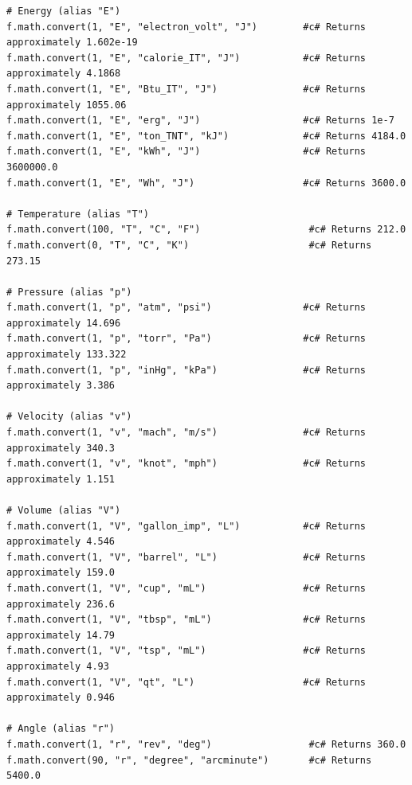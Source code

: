 \begin{verbatim}
# Energy (alias "E")
f.math.convert(1, "E", "electron_volt", "J")        #c# Returns approximately 1.602e-19
f.math.convert(1, "E", "calorie_IT", "J")           #c# Returns approximately 4.1868
f.math.convert(1, "E", "Btu_IT", "J")               #c# Returns approximately 1055.06
f.math.convert(1, "E", "erg", "J")                  #c# Returns 1e-7
f.math.convert(1, "E", "ton_TNT", "kJ")             #c# Returns 4184.0
f.math.convert(1, "E", "kWh", "J")                  #c# Returns 3600000.0
f.math.convert(1, "E", "Wh", "J")                   #c# Returns 3600.0

# Temperature (alias "T")
f.math.convert(100, "T", "C", "F")                   #c# Returns 212.0
f.math.convert(0, "T", "C", "K")                     #c# Returns 273.15

# Pressure (alias "p")
f.math.convert(1, "p", "atm", "psi")                #c# Returns approximately 14.696
f.math.convert(1, "p", "torr", "Pa")                #c# Returns approximately 133.322
f.math.convert(1, "p", "inHg", "kPa")               #c# Returns approximately 3.386

# Velocity (alias "v")
f.math.convert(1, "v", "mach", "m/s")               #c# Returns approximately 340.3
f.math.convert(1, "v", "knot", "mph")               #c# Returns approximately 1.151

# Volume (alias "V")
f.math.convert(1, "V", "gallon_imp", "L")           #c# Returns approximately 4.546
f.math.convert(1, "V", "barrel", "L")               #c# Returns approximately 159.0
f.math.convert(1, "V", "cup", "mL")                 #c# Returns approximately 236.6
f.math.convert(1, "V", "tbsp", "mL")                #c# Returns approximately 14.79
f.math.convert(1, "V", "tsp", "mL")                 #c# Returns approximately 4.93
f.math.convert(1, "V", "qt", "L")                   #c# Returns approximately 0.946

# Angle (alias "r")
f.math.convert(1, "r", "rev", "deg")                 #c# Returns 360.0
f.math.convert(90, "r", "degree", "arcminute")       #c# Returns 5400.0
\end{verbatim}

